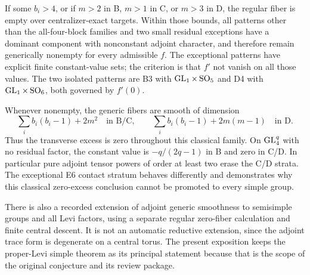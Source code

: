 If some $b_i>4$, or if $m>2$ in B, $m>1$ in C, or $m>3$ in D, the regular fiber is empty over centralizer-exact targets. Within those bounds, all patterns other than the all-four-block families and two small residual exceptions have a dominant component with nonconstant adjoint character, and therefore remain generically nonempty for every admissible $f$. The exceptional patterns have explicit finite constant-value sets; the criterion is that $f'$ not vanish on all those values. The two isolated patterns are B3 with $\operatorname{GL}_1\times\operatorname{SO}_5$ and D4 with $\operatorname{GL}_1\times\operatorname{SO}_6$, both governed by $f'(0)$.

Whenever nonempty, the generic fibers are smooth of dimension
\[
 \sum_i b_i(b_i-1)+2m^2\quad\text{in B/C},\qquad
 \sum_i b_i(b_i-1)+2m(m-1)\quad\text{in D}.
\]
Thus the transverse excess is zero throughout this classical family. On $\operatorname{GL}_4^q$ with no residual factor, the constant value is $-q/(2q-1)$ in B and zero in C/D. In particular pure adjoint tensor powers of order at least two erase the C/D strata. The exceptional E6 contact stratum behaves differently and demonstrates why this classical zero-excess conclusion cannot be promoted to every simple group.

There is also a recorded extension of adjoint generic smoothness to semisimple groups and all Levi factors, using a separate regular zero-fiber calculation and finite central descent. It is not an automatic reductive extension, since the adjoint trace form is degenerate on a central torus. The present exposition keeps the proper-Levi simple theorem as its principal statement because that is the scope of the original conjecture and its review package.

